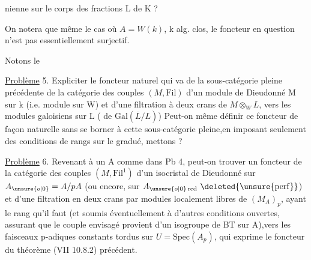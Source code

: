 nienne sur le corps des fractions  L de K ?

On notera que même  le cas où $A=W(k)$, k alg. clos, le foncteur en question n'est pas  essentiellement surjectif.

Notons le

\uline{Problème} 5.  Expliciter le foncteur naturel qui va de la sous-catégorie pleine précédente de la catégorie des couples  $(M,\mathrm{Fil})$ d'un module de Dieudonné M sur  k (i.e.  module sur W) et d'une filtration à deux crans de $M\otimes_W L$, vers les modules galoisiens sur L (  de $\mathrm{Gal}(\overline{L}/L)$) Peut-on même définir ce foncteur  de façon naturelle sans se borner à cette sous-catégorie pleine,en imposant seulement des conditions de rangs sur le gradué, mettons ?

\uline{Problème} 6. Revenant à un A comme dans Pb 4, peut-on trouver un foncteur  de la catégorie des couples $(M,\mathrm{Fil}^{1})$ d'un isocristal de Dieudonné  sur $A_{\unsure{o|0}}=A/pA$ (ou encore, sur $A_{\unsure{o|0}\,\mathrm{red}}\ \deleted{\unsure{\mathrm{perf}}}$) et d'une filtration en deux crans par modules localement libres de $(M_A)_p$, ayant le rang qu'il faut\deleted{\unsure{,}} (et soumis éventuellement à d'autres conditions ouvertes, assurant que le couple envisagé provient d'un isogroupe de BT sur A),vers les faisceaux p-adiques constants tordus sur $U=\mathrm{Spec}(A_p)$, qui exprime le foncteur du théorème (VII 10.8.2) précédent.



